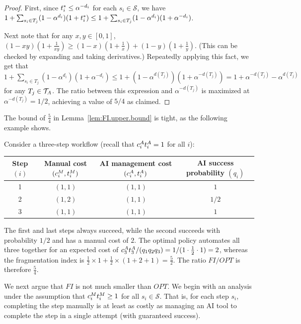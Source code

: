 \begin{proof}
First, since $t^*_{i} \leq \alpha^{-d_i}$ for each $s_i \in \mathcal{S}$, we have $1 + \sum_{s_i \in T_j}(1-\alpha^{d_i})(1+t^*_{i}) \leq 1 + \sum_{s_i \in T_j}(1-\alpha^{d_i})(1+\alpha^{-d_i})$.

Next note that for any $x,y\in [0,1]$, $(1-xy)(1+\tfrac{1}{xy}) \geq (1-x)(1+\tfrac{1}{x}) + (1-y)(1+\tfrac{1}{y})$.
(This can be checked by expanding and taking derivatives.)
Repeatedly applying this fact, we get that $1 + \sum_{s_i \in T_j}(1-\alpha^{d_i})(1+\alpha^{-d_i}) \leq 1 + (1-\alpha^{d(T_j)})(1+\alpha^{-d(T_j)}) = 1 + \alpha^{-d(T_j)} - \alpha^{d(T_j)}$ for any $T_j \in \mathcal{T}_{A}$.
The ratio between this expression and $\alpha^{-d(T_j)}$ is maximized at $\alpha^{-d(T_j)} = 1/2$, achieving a value of $5/4$ as claimed.
\end{proof}

The bound of $\tfrac{5}{4}$ in Lemma~\ref{lem:FI.upper.bound} is tight, as the following example shows.

\begin{example}
\label{ex:FI.tight}
Consider a three-step workflow (recall that $c^{A}_{i}t^{A}_{i} = 1$ for all $i$):
\begin{center}
\begin{tabular}{c|ccc}
\toprule
\makecell{Step\\$(i)$} & \makecell{Manual cost\\$(c^{M}_{i}, t^{M}_{i})$} & \makecell{AI management cost\\$(c^{A}_{i}, t^{A}_{i})$} & \makecell{AI success probability\\$(q_i)$} \\
\midrule
1 & $(1, 1)$ & $(1, 1)$ & $1$ \\
2 & $(1, 2)$ & $(1, 1)$ & $1/2$ \\
3 & $(1, 1)$ & $(1, 1)$ & $1$ \\
\bottomrule
\end{tabular}
\end{center}
The first and last steps always succeed, while the second succeeds with probability $1/2$ and has a manual cost of $2$.
The optimal policy automates all three together for an expected cost of $c^{A}_{3}t^{A}_{3}/(q_1 q_2 q_3) = 1/(1 \cdot \tfrac12 \cdot 1) = 2$, whereas the fragmentation index is $\tfrac12 \times 1 + \tfrac12 \times (1+2+1) = \tfrac52$.
The ratio $FI/OPT$ is therefore $\tfrac54$.
\end{example}

We next argue that $FI$ is not much smaller than $OPT$.
We begin with an analysis under the assumption that $c^{M}_{i}t^{M}_{i} \geq 1$ for all $s_i \in \mathcal{S}$.
That is, for each step $s_i$, completing the step manually is at least as costly as managing an AI tool to complete the step in a single attempt (with guaranteed success).

